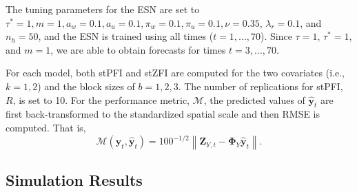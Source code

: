 \documentclass[AMS,STIX2COL]{WileyNJD-v2}
\begin{document}
The tuning parameters for the ESN are set to $\tau^*=1,m=1,a_w=0.1,a_u=0.1,\pi_w=0.1,\pi_u=0.1,\nu=0.35$, $\lambda_r=0.1$, and $n_h=50$, and the ESN is trained using all times ($t=1,...,70$). Since $\tau=1$, $\tau^*=1$, and $m=1$, we are able to obtain forecasts for times $t=3,...,70$.

For each model, both stPFI and stZFI are computed for the two covariates (i.e., $k=1,2$) and the block sizes of $b=1,2,3$. The number of replications for stPFI, $R$, is set to 10. For the performance metric, $\mathcal{M}$, the predicted values of $\hat{\textbf{y}}_t$ are first back-transformed to the standardized spatial scale and then RMSE is computed. That is, $$\mathcal{M}\left(\textbf{y}_t,\hat{\textbf{y}}_t\right)=100^{-1/2} \left\lVert\textbf{Z}_{Y,t}-\boldsymbol{\Phi}_Y\hat{\textbf{y}}_t\right\rVert.$$

\subsection{Simulation Results}
\end{document}
